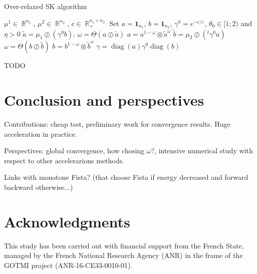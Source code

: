 \documentclass{article} %
\DeclareMathOperator{\IR}{\mathbb{R}}
\DeclareMathOperator{\diag}{diag}
\renewcommand{\epsilon}{\varepsilon}
\theoremstyle{plain}
\theoremstyle{definition}
\theoremstyle{remark}
\begin{document}
\begin{algorithm}
\caption{Over-relaxed SK algorithm }
\label{SOR}
\begin{algorithmic}
\REQUIRE $\mu^1\in \IR^{n_1}$, $\mu^2\in \IR^{n_2}$, $c\in \IR^{n_1\times n_2}_+$
\STATE Set $a=\mathbf{1}_{n_1}$, $b=\mathbf{1}_{n_2}$, $\gamma^0=e^{-c/\epsilon}$, $\theta_0\in[1;2)$ and $\eta>0$
\STATE $\tilde a=\mu_1\oslash (\gamma^0 b)$, 
\STATE $\omega=\Theta(a\oslash\tilde a)$
\STATE  $a=a^{1-\omega}\otimes \tilde a^\omega$%
\STATE $\tilde b=\mu_2\oslash (^t\gamma^0  a)$
\STATE $\omega=\Theta(b\oslash\tilde b)$
\STATE  $b=b^{1-\omega}\otimes \tilde b^\omega$%
\ENDWHILE
 \RETURN $\gamma=\diag(a)\gamma^0\diag(b)$
\end{algorithmic}
\end{algorithm}



{\color{red} TODO}


\section{Conclusion and perspectives}
Contributions: 
cheap test, preliminary work for convergence results. Huge acceleration in practice.


Perspectives:
global convergence, how chosing $\omega$?, intensive numerical study with respect to other accelerarions methods\cite{2016arXiv160604133S,2017arXiv170509634A}.

Links with monotone Fista? (that choose Fista if energy decreased and forward backward otherwise...)





\section*{Acknowledgments}
This study has been carried out with financial support from the French State, managed by the French National Research Agency (ANR) in the frame of the  GOTMI project (ANR-16-CE33-0010-01).




\end{document}
